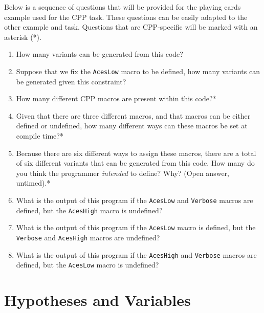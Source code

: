 \documentclass[11pt]{article}
\begin{document}
Below is a sequence of questions that will be provided for the playing cards
example used for the CPP task.  These questions can be easily adapted to the
other example and task.  Questions that are CPP-specific will be marked with an
asterisk (*).

\begin{enumerate}[label=Q\arabic*:,leftmargin=*]%

\item How many variants can be generated from this code?

\item Suppose that we fix the \texttt{AcesLow} macro to be defined, how many
variants can be generated given this constraint?

\item How many different CPP macros are present within this code?*

\item Given that there are three different macros, and that macros can be
either defined or undefined, how many different ways can these macros be set at
compile time?*

\item Because there are six different ways to assign these macros, there are
a total of six different variants that can be generated from this code.  How
many do you think the programmer \emph{intended} to define?  Why?  (Open
answer, untimed).*

\item What is the output of this program if the \texttt{AcesLow} and
\texttt{Verbose} macros are defined, but the \texttt{AcesHigh} macro is
undefined?

\item What is the output of this program if the \texttt{AcesLow} macro is
defined, but the \texttt{Verbose} and \texttt{AcesHigh} macros are undefined?

\item What is the output of this program if the \texttt{AcesHigh} and
\texttt{Verbose} macros are defined, but the \texttt{AcesLow} macro is
undefined?

\end{enumerate}


\section{Hypotheses and Variables}
\label{sec:hypotheses}
\end{document}
